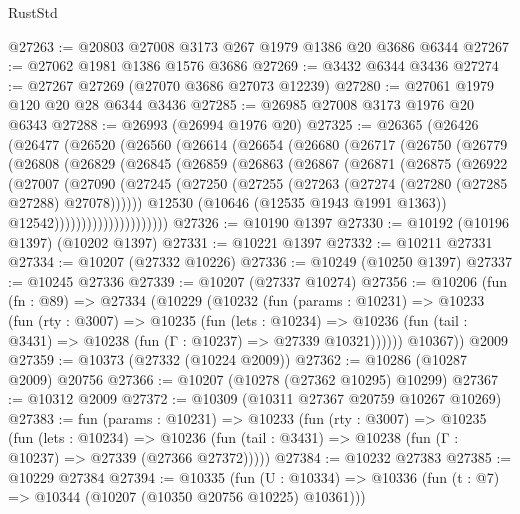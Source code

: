 \begin{lexlean}{RustStd}
\begin{coremodule}
@27263 := @20803 @27008 @3173 @267 @1979 @1386 @20 @3686 @6344
@27267 := @27062 @1981 @1386 @1576 @3686
@27269 := @3432 @6344 @3436
@27274 := @27267 @27269 (@27070 @3686 @27073 @12239)
@27280 := @27061 @1979 @120 @20 @28 @6344 @3436
@27285 := @26985 @27008 @3173 @1976 @20 @6343
@27288 := @26993 (@26994 @1976 @20)
@27325 := @26365
    (@26426
      (@26477
        (@26520
          (@26560
            (@26614
              (@26654
                (@26680
                  (@26717
                    (@26750
                      (@26779
                        (@26808
                          (@26829
                            (@26845
                              (@26859
                                (@26863
                                  (@26867
                                    (@26871
                                      (@26875
                                        (@26922
                                          (@27007
                                            (@27090
                                              (@27245
                                                (@27250
                                                  (@27255
                                                    (@27263
                                                      (@27274 (@27280 (@27285 @27288) @27078))))))
                                              @12530
                                              (@10646 (@12535 @1943 @1991 @1363))
                                              @12542)))))))))))))))))))))
@27326 := @10190 @1397
@27330 := @10192 (@10196 @1397) (@10202 @1397)
@27331 := @10221 @1397
@27332 := @10211 @27331
@27334 := @10207 (@27332 @10226)
@27336 := @10249 (@10250 @1397)
@27337 := @10245 @27336
@27339 := @10207 (@27337 @10274)
@27356 := @10206
    (fun (fn : @89) =>
    @27334
      (@10229
        (@10232
          (fun (params : @10231) =>
          @10233
            (fun (rty : @3007) =>
            @10235
              (fun (lets : @10234) =>
              @10236 (fun (tail : @3431) => @10238 (fun (Γ : @10237) => @27339 @10321))))))
        @10367))
    @2009
@27359 := @10373 (@27332 (@10224 @2009))
@27362 := @10286 (@10287 @2009) @20756
@27366 := @10207 (@10278 (@27362 @10295) @10299)
@27367 := @10312 @2009
@27372 := @10309 (@10311 @27367 @20759 @10267 @10269)
@27383 := fun (params : @10231) =>
  @10233
    (fun (rty : @3007) =>
    @10235
      (fun (lets : @10234) =>
      @10236 (fun (tail : @3431) => @10238 (fun (Γ : @10237) => @27339 (@27366 @27372)))))
@27384 := @10232 @27383
@27385 := @10229 @27384
@27394 := @10335
    (fun (U : @10334) => @10336 (fun (t : @7) => @10344 (@10207 (@10350 @20756 @10225) @10361)))

\end{coremodule}
\end{lexlean}
